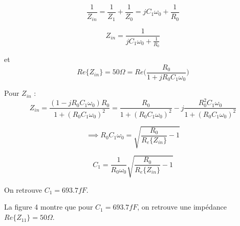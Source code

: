 \documentclass[a4paper]{article}
\begin{document}
\[
\frac{1}{Z_{in}} =\frac{1}{Z_1} + \frac{1}{Z_0} = jC_1\omega_0 + \frac{1}{R_0}
\]

\[
Z_{in} = \frac{1}{jC_1\omega_0 + \frac{1}{R_0}}
\]

et
\[
Re\{Z_{in}\} = 50 \Omega = Re\bigg(\frac{R_0}{1+ j R_0 C_1 \omega_0}\bigg)
\]

Pour $Z_{in}$ :
\[
Z_{in} = \frac{(1 - j R_0 C_1 \omega_0) R_0}{1 + (R_0 C_1 \omega_0)^2} =\frac{R_0}{1 + (R_0 C_1 \omega_0)^2} - j \frac{R^2_0 C_1 \omega_0} {1 + (R_0 C_1 \omega_0)^2}
\]

\[
\implies R_0 C_1 \omega_0 = \sqrt{\frac{R_0}{R_e\{Z_{in}\}} - 1}
\]

\[
 C_1  = \frac{1}{R_0 \omega_0}\sqrt{\frac{R_0}{R_e\{Z_{in}\}} - 1}
\]

On retrouve $ C_1 = 693.7 fF$.

La figure 4 montre que pour  $ C_1 = 693.7 fF$, on retrouve une imp\'edance
$Re\{Z_{11}\} = 50 \Omega$.

\clearpage
\end{document}

